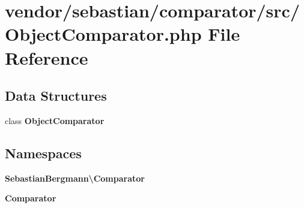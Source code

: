 \section{vendor/sebastian/comparator/src/\+Object\+Comparator.php File Reference}
\label{_object_comparator_8php}
\subsection*{Data Structures}
\begin{DoxyCompactItemize}
\item 
class {\bf Object\+Comparator}
\end{DoxyCompactItemize}
\subsection*{Namespaces}
\begin{DoxyCompactItemize}
\item 
 {\bf Sebastian\+Bergmann\textbackslash{}\+Comparator}
\item 
 {\bf Comparator}
\end{DoxyCompactItemize}
